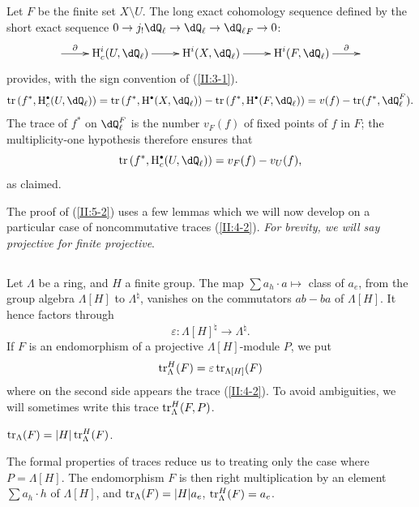Let $F$ be the finite set $X\setminus U$. The long exact cohomology sequence
defined by the short exact sequence
$0\to j_! \dQ_\ell\to\dQ_\ell\to{\dQ_\ell}_F\to 0$:
\[\xymatrix{
  \ar[r]^-\partial
    & \h_c^i(U,\dQ_\ell) \ar[r]
    & \h^i(X,\dQ_\ell) \ar[r]
    & \h^i(F,\dQ_\ell) \ar[r]^-\partial
    &
}\]
provides, with the sign convention of (\ref{II:3-1}).
\[
  \tr\left(f^*,\h_c^\bullet(U,\dQ_\ell)\right)
    = \tr\left(f^*,\h^\bullet(X,\dQ_\ell)\right) - \tr\left(f^*,\h^\bullet(F,\dQ_\ell)\right)
    = v(f) - \tr(f^*,\dQ_\ell^F) \text{.}
\]
The trace of $f^*$ on $\dQ_\ell^F$ is the number $v_F(f)$ of fixed points of
$f$ in $F$; the multiplicity-one hypothesis therefore ensures that
\[
  \tr\left(f^*,\h_c^\bullet(U,\dQ_\ell)\right)
    = v_F(f) - v_U(f) \text{,}
\]
as claimed.

The proof of (\ref{II:5-2}) uses a few lemmas which we will now
develop on a particular case of noncommutative traces
(\ref{II:4-2}). \emph{For brevity, we will say projective for finite projective}.




\subsection{}\label{II:5-5}

Let $\Lambda$ be a ring, and $H$ a finite group. The map
$\sum a_h \cdot a\mapsto $ class of $a_e$, from the group algebra
$\Lambda[H]$ to $\Lambda^\natural$, vanishes on the commutators $ab-ba$ of
$\Lambda[H]$. It hence factors through
\[
  \varepsilon : \Lambda[H]^\natural \to \Lambda^\natural \text{.}
\]
If $F$ is an endomorphism of a projective $\Lambda[H]$-module $P$, we put
\[
  \operatorname{tr}_\Lambda^H(F) = \varepsilon \operatorname{tr}_{\Lambda[H]} (F)
\]
where on the second side appears the trace (\ref{II:4-2}). To avoid
ambiguities, we will sometimes write this trace $\operatorname{tr}_\Lambda^H(F,P)$.




\begin{proposition_}\label{II:5-6}
$\operatorname{tr}_\Lambda(F) = |H|\operatorname{tr}_\Lambda^H(F)$.
\end{proposition_}

The formal properties of traces reduce us to treating only the
case where $P=\Lambda[H]$. The endomorphism $F$ is then right multiplication
by an element $\sum a_h\cdot h$ of $\Lambda[H]$, and
$\operatorname{tr}_\Lambda(F) = |H| a_e$, $\operatorname{tr}_\Lambda^H(F) = a_e$.




\subsection{}\label{II:5-7}

